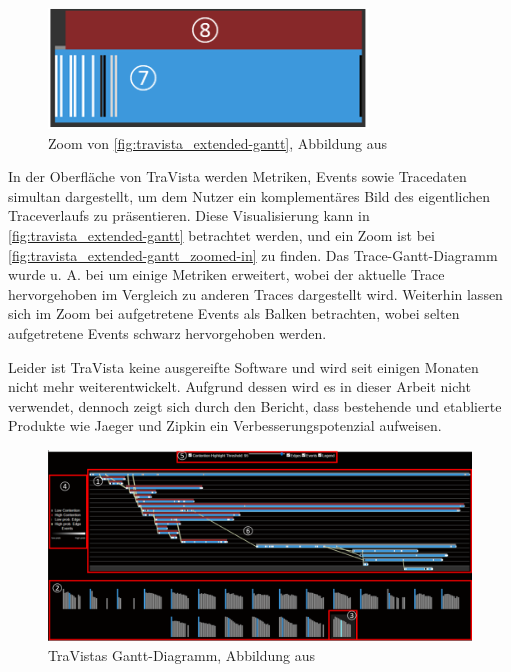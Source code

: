 \begin{figure}
\centering
\vspace{-1.5\baselineskip}
\includegraphics[width=\linewidth]{img/03_methoden/travista_extended-gantt_zoomed-in.png}
\caption{Zoom von \autoref{fig:travista_extended-gantt}, Abbildung aus \cite{TraVistaPaper}}
\label{fig:travista_extended-gantt_zoomed-in}
\end{figure}

In der Oberfläche von TraVista werden Metriken, Events sowie Tracedaten simultan dargestellt, um dem Nutzer ein komplementäres Bild des eigentlichen Traceverlaufs zu präsentieren. Diese Visualisierung kann in \autoref{fig:travista_extended-gantt} betrachtet werden, und ein Zoom ist bei \autoref{fig:travista_extended-gantt_zoomed-in} zu finden. Das Trace-Gantt-Diagramm wurde u. A. bei  um einige Metriken erweitert, wobei der aktuelle Trace hervorgehoben im Vergleich zu anderen Traces dargestellt wird. Weiterhin lassen sich im Zoom bei  aufgetretene Events als Balken betrachten, wobei selten aufgetretene Events schwarz hervorgehoben werden.

Leider ist TraVista keine ausgereifte Software und wird seit einigen Monaten nicht mehr weiterentwickelt\footnotemark{}. Aufgrund dessen wird es in dieser Arbeit nicht verwendet, dennoch zeigt sich durch den Bericht, dass bestehende und etablierte Produkte wie Jaeger und Zipkin ein Verbesserungspotenzial aufweisen.


\begin{figure}[H]
	\centering
	\includegraphics[width=0.815\linewidth]{img/03_methoden/travista_extended-gantt.png}
	\caption{TraVistas Gantt-Diagramm, Abbildung aus \cite{TraVistaPaper}}
	\label{fig:travista_extended-gantt}
\end{figure}

